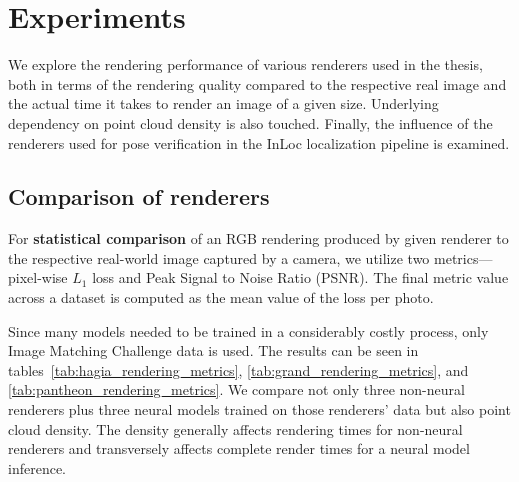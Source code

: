 \section{Experiments} %

We explore the rendering performance of various renderers used in the thesis,
both in terms of the rendering quality compared to the respective real image
and the actual time it takes to render an image of a given size. Underlying
dependency on point cloud density is also touched. Finally, the influence of the
renderers used for pose verification in the InLoc localization pipeline is examined.


\subsection{Comparison of renderers}

For \textbf{statistical comparison} of an RGB rendering produced by
given renderer to the
respective real-world image captured by a camera, we utilize two
metrics---pixel-wise $L_1$ loss and Peak Signal to Noise Ratio (PSNR). The final metric
value across a dataset is computed as the mean value of the loss per photo.

Since many models needed to be trained in a considerably costly
process, only Image Matching Challenge data is used. The results can be seen in
tables~\cref{tab:hagia_rendering_metrics}, \cref{tab:grand_rendering_metrics},
and \cref{tab:pantheon_rendering_metrics}. We compare not only three non-neural
renderers plus three neural models trained on those renderers' data but
also point cloud density. The density generally affects rendering times for
non-neural renderers and transversely affects complete render
times for a neural model inference.

